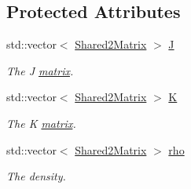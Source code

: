 \subsection*{Protected Attributes}
\begin{DoxyCompactItemize}
\item 
std::vector$<$ \hyperlink{namespaceJKBuilder_a490b0a0cd0b0f8f0e280e29b03eb51a3}{Shared2Matrix} $>$ \hyperlink{classJKBuilder_1_1SharedFactory_afabc3015deddc9247c1c2822431a724f}{J}
\begin{DoxyCompactList}\small\item\em The J \hyperlink{classJKBuilder_1_1matrix}{matrix}. \item\end{DoxyCompactList}\item 
std::vector$<$ \hyperlink{namespaceJKBuilder_a490b0a0cd0b0f8f0e280e29b03eb51a3}{Shared2Matrix} $>$ \hyperlink{classJKBuilder_1_1SharedFactory_a59469c5d5576ee51c033626879e699b1}{K}
\begin{DoxyCompactList}\small\item\em The K \hyperlink{classJKBuilder_1_1matrix}{matrix}. \item\end{DoxyCompactList}\item 
std::vector$<$ \hyperlink{namespaceJKBuilder_a490b0a0cd0b0f8f0e280e29b03eb51a3}{Shared2Matrix} $>$ \hyperlink{classJKBuilder_1_1SharedFactory_af21e4022fc5e357635e5b22bb359fcba}{rho}
\begin{DoxyCompactList}\small\item\em The density. \item\end{DoxyCompactList}\end{DoxyCompactItemize}
